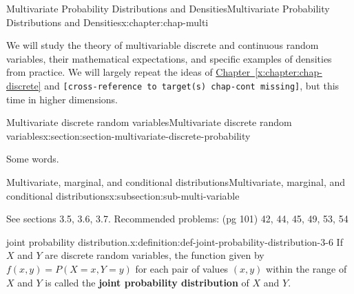 \documentclass[oneside,10pt,]{book}
\newcommand{\xreffont}{\relax}
\newcommand{\mono}[1]{\texttt{#1}}
\newcommand{\terminology}[1]{\textbf{#1}}
\numberwithin{equation}{section}
\begin{document}
%
%
\typeout{************************************************}
\typeout{************************************************}
%
\begin{chapterptx}{Multivariate Probability Distributions and Densities}{}{Multivariate Probability Distributions and Densities}{}{}{x:chapter:chap-multi}
\begin{introduction}{}%
We will study the theory of multivariable discrete and continuous random variables, their mathematical expectations, and specific examples of densities from practice. We will largely repeat the ideas of \hyperref[x:chapter:chap-discrete]{Chapter~{\xreffont\ref{x:chapter:chap-discrete}}} and \mono{[cross-reference to target(s) \textquotedbl{}chap-cont\textquotedbl{} missing]}, but this time in higher dimensions.%
\end{introduction}%
%
%
\typeout{************************************************}
\typeout{************************************************}
%
\begin{sectionptx}{Multivariate discrete random variables}{}{Multivariate discrete random variables}{}{}{x:section:section-multivariate-discrete-probability}
\begin{introduction}{}%
Some words.%
\end{introduction}%
%
%
\typeout{************************************************}
\typeout{************************************************}
%
\begin{subsectionptx}{Multivariate, marginal, and conditional distributions}{}{Multivariate, marginal, and conditional distributions}{}{}{x:subsection:sub-multi-variable}
\begin{introduction}{}%
See sections 3.5, 3.6, 3.7. Recommended problems: (pg 101) 42, 44, 45, 49, 53, 54%
\end{introduction}%
\begin{definition}{joint probability distribution.}{x:definition:def-joint-probability-distribution-3-6}%
If \(\displaystyle X\) and \(\displaystyle Y\) are discrete random variables, the function given by \(\displaystyle f(x,y) = P(X=x,
Y=y)\) for each pair of values \(\displaystyle (x,y)\) within the range of \(\displaystyle X\) and \(\displaystyle Y\) is called the \terminology{joint probability distribution} of \(\displaystyle X\) and \(\displaystyle Y\).%
\end{definition}

\end{subsectionptx}
\end{sectionptx}
\end{chapterptx}
\end{document}
